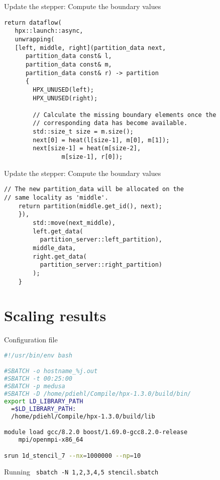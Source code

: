 \documentclass[\classoption]{beamer}
\begin{document}
\begin{frame}[fragile]{Update the stepper: Compute the boundary values}

\begin{lstlisting}
return dataflow(
   hpx::launch::async,
   unwrapping(
   [left, middle, right](partition_data next, 
      partition_data const& l,
      partition_data const& m, 
      partition_data const& r) -> partition
      {
        HPX_UNUSED(left);
        HPX_UNUSED(right);

        // Calculate the missing boundary elements once the
        // corresponding data has become available.
        std::size_t size = m.size();
        next[0] = heat(l[size-1], m[0], m[1]);
        next[size-1] = heat(m[size-2], 
        		m[size-1], r[0]);
\end{lstlisting}

\end{frame}

\begin{frame}[fragile]{Update the stepper: Compute the boundary values}

\begin{lstlisting}
// The new partition_data will be allocated on the 
// same locality as 'middle'.
	return partition(middle.get_id(), next);
	}),
		std::move(next_middle),
		left.get_data(
		  partition_server::left_partition),
		middle_data,
		right.get_data(
		  partition_server::right_partition)
        );
    }
\end{lstlisting}

\end{frame}


\section{Scaling results}

\begin{frame}[fragile]{Configuration file}

\begin{lstlisting}[language=bash]
#!/usr/bin/env bash

#SBATCH -o hostname_%j.out
#SBATCH -t 00:25:00
#SBATCH -p medusa
#SBATCH -D /home/pdiehl/Compile/hpx-1.3.0/build/bin/
export LD_LIBRARY_PATH
  =$LD_LIBRARY_PATH:
  /home/pdiehl/Compile/hpx-1.3.0/build/lib

module load gcc/8.2.0 boost/1.69.0-gcc8.2.0-release 
	mpi/openmpi-x86_64   

srun 1d_stencil_7 --nx=1000000 --np=10 
\end{lstlisting}

\begin{block}{Running}
\lstinline| sbatch -N 1,2,3,4,5 stencil.sbatch|
\end{block}

\end{frame}
\end{document}
